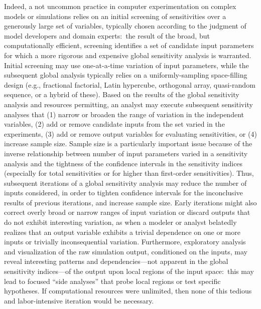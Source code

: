 \documentclass[12pt]{article}
\begin{document}
Indeed, a not uncommon practice in computer experimentation on complex models or simulations relies on an initial screening of sensitivities over a generously large set of variables, typically chosen according to the judgment of model developers and domain experts:\ the result of the broad, but computationally efficient, screening identifies a set of candidate input parameters for which a more rigorous and expensive global sensitivity analysis is warranted. Initial screening may use one-at-a-time variation of input parameters, while the subsequent global analysis typically relies on a uniformly-sampling space-filling design (e.g., fractional factorial, Latin hypercube, orthogonal array, quasi-random sequence, or a hybrid of these).
Based on the results of the global sensitivity analysis and resources permitting, an analyst may execute subsequent sensitivity analyses that (1) narrow or broaden the range of variation in the independent variables, (2) add or remove candidate inputs from the set varied in the experiments, (3) add or remove output variables for evaluating sensitivities, or (4) increase sample size. Sample size is a particularly important issue because of the inverse relationship between number of input parameters varied in a sensitivity analysis and the tightness of the confidence intervals in the sensitivity indices (especially for total sensitivities or for higher than first-order sensitivities). Thus, subsequent iterations of a global sensitivity analysis may reduce the number of inputs considered, in order to tighten confidence intervals for the inconclusive results of previous iterations, and increase sample size. Early iterations might also correct overly broad or narrow ranges of input variation or discard outputs that do not exhibit interesting variation, as when a modeler or analyst belatedly realizes that an output variable exhibits a trivial dependence on one or more inputs or trivially inconsequential variation. Furthermore, exploratory analysis and visualization of the raw simulation output, conditioned on the inputs, may reveal interesting patterns and dependencies---not apparent in the global sensitivity indices---of the output upon local regions of the input space:\ this may lead to focused ``side analyses'' that probe local regions or test specific hypotheses. If computational resources were unlimited, then none of this tedious and labor-intensive iteration would be necessary.
\end{document}
